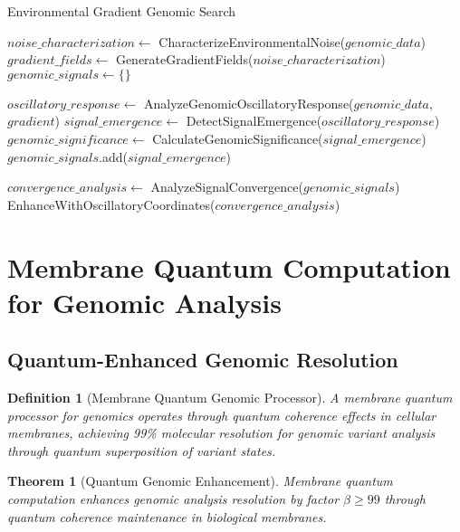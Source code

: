 \documentclass[12pt,a4paper]{article}
\newtheorem{theorem}{Theorem}
\newtheorem{definition}{Definition}
\begin{document}
\begin{algorithm}
\caption{Environmental Gradient Genomic Search}
\begin{algorithmic}
    \State $noise\_characterization \gets$ CharacterizeEnvironmentalNoise($genomic\_data$)
    \State $gradient\_fields \gets$ GenerateGradientFields($noise\_characterization$)
    \State $genomic\_signals \gets \{\}$
    
        \State $oscillatory\_response \gets$ AnalyzeGenomicOscillatoryResponse($genomic\_data$, $gradient$)
        \State $signal\_emergence \gets$ DetectSignalEmergence($oscillatory\_response$)
        \State $genomic\_significance \gets$ CalculateGenomicSignificance($signal\_emergence$)
            \State $genomic\_signals$.add($signal\_emergence$)
        \EndIf
    \EndFor
    
    \State $convergence\_analysis \gets$ AnalyzeSignalConvergence($genomic\_signals$)
    \State \Return EnhanceWithOscillatoryCoordinates($convergence\_analysis$)
\EndProcedure
\end{algorithmic}
\end{algorithm}

\section{Membrane Quantum Computation for Genomic Analysis}

\subsection{Quantum-Enhanced Genomic Resolution}

\begin{definition}[Membrane Quantum Genomic Processor]
A membrane quantum processor for genomics operates through quantum coherence effects in cellular membranes, achieving 99\% molecular resolution for genomic variant analysis through quantum superposition of variant states.
\end{definition}

\begin{theorem}[Quantum Genomic Enhancement]
Membrane quantum computation enhances genomic analysis resolution by factor $\beta \geq 99$ through quantum coherence maintenance in biological membranes.
\end{theorem}
\end{document}
